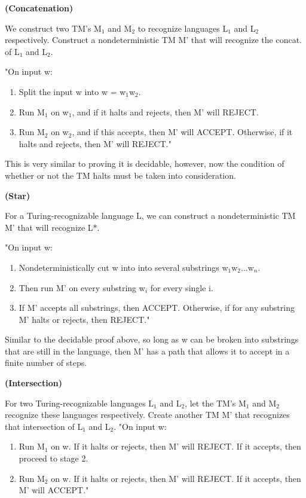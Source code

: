 \documentclass[11pt]{article}
\renewcommand\part[1]{\vspace{.10in}\textbf{(#1)}\par}
\begin{document}
	\part{Concatenation}
		We construct two TM's M$_{1}$ and M$_{2}$ to recognize languages L$_{1}$ and L$_{2}$ respectively. Construct a nondeterministic TM M' that will recognize the concat. of L$_{1}$ and L$_{2}$.\par
		"On input w:
		\begin{enumerate}
			\item Split the input w into w = w$_{1}$w$_{2}$.
			\item Run M$_{1}$ on w$_{1}$, and if it halts and rejects, then M' will REJECT.
			\item Run M$_{2}$ on w$_{2}$, and if this accepts, then M' will ACCEPT. Otherwise, if it halts and rejects, then M' will REJECT."
		\end{enumerate}
		
		This is very similar to proving it is decidable, however, now the condition of whether or not the TM halts must be taken into consideration.
		
	\part{Star}
		For a Turing-recognizable language L, we can construct a nondeterministic TM M' that will recognize L*. \par
		"On input w:
		\begin{enumerate}
			\item Nondeterministically cut w into into several substrings w$_{1}$w$_{2}$...w$_{n}$.
			\item Then run M' on every substring w$_{i}$ for every single i. 
			\item If M' accepts all substrings, then ACCEPT. Otherwise, if for any substring M' halts or rejects, then REJECT."
		\end{enumerate}
		Similar to the decidable proof above, so long as w can be broken into substrings that are still in the language, then M' has a path that allows it to accept in a finite number of steps.
		
	\part{Intersection}
		For two Turing-recognizable languages L$_{1}$ and L$_{2}$, let the TM's M$_{1}$ and M$_{2}$ recognize these languages respectively. Create another TM M' that recognizes that intersection of L$_{1}$ and L$_{2}$. 
		"On input w:
		\begin{enumerate}
			\item Run M$_{1}$ on w. If it halts or rejects, then M' will REJECT. If it accepts, then proceed to stage 2.
			\item Run M$_{2}$ on w. If it halts or rejects, then M' will REJECT. If it accepts, then M' will ACCEPT."
		\end{enumerate}
		
\end{document}
